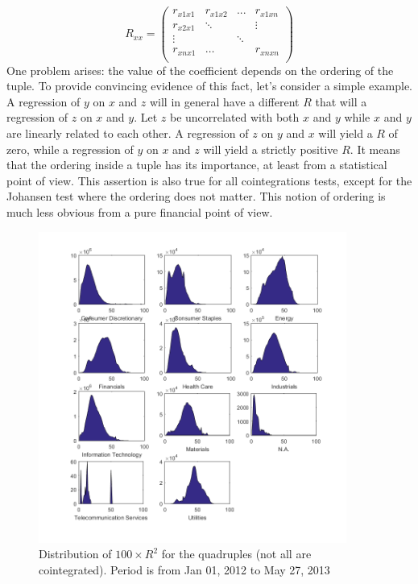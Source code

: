 \documentclass[11pt,a4,twosided,singlespacing,titlepagenumber=on]{scrreprt}
\numberwithin{equation}{chapter} %
\theoremstyle{remark}
\begin{document}
\begin{equation}
R_{xx} =\begin{pmatrix}
r_{x1x1}    & r_{x1x2} & ...  & r_{x1xn}  \\
r_{x2x1}    & \ddots &   & \vdots  \\
\vdots       &   & \ddots &   \\
r_{xnx1}    & \hdots &   & r_{xnxn} \\
\end{pmatrix} 
\end{equation}
One problem arises: the value of the coefficient depends on the ordering of the tuple. To provide convincing evidence of this fact, let's consider a simple example. A regression of $y$ on $x$ and $z$ will in general have a different $R$ that will a regression of $z$ on $x$ and $y$. Let $z$ be uncorrelated with both $x$ and $y$ while $x$ and $y$ are linearly related to each other. A regression of $z$ on $y$ and $x$ will yield a $R$ of zero, while a regression of $y$ on $x$ and $z$ will yield a strictly positive $R$. It means that the ordering inside a tuple has its importance, at least from a statistical point of view. This assertion is also true for all cointegrations tests, except for the Johansen test where the ordering does not matter. This notion of ordering is much less obvious from a pure financial point of view. \\

\begin{figure}[H]
\centering
\includegraphics[width = 0.9\textwidth]{R2_ret_Quads_Jan_1_2012_Mar_27_2013}
\caption{Distribution of $100 \times R^2$ for the quadruples (not all are cointegrated). Period is from Jan 01, 2012 to May 27, 2013}
\label{dist_100_r2_quad}
\end{figure}
\end{document}
